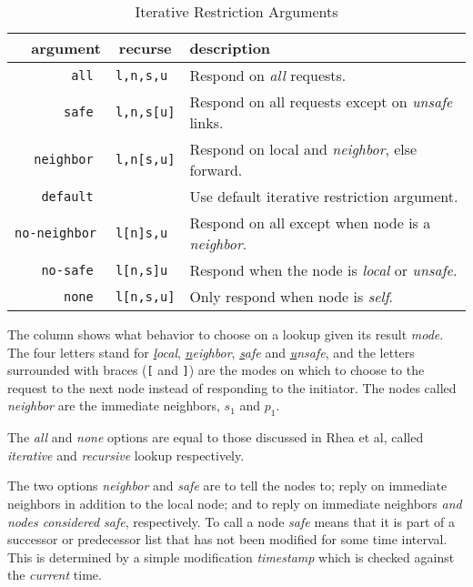 \begin{table}[htp]
\begin{center}
\begin{tabular}{|r|c|l|}                                                                       \hline
{\bf argument    } & {\bf recurse } & {\bf description}                                     \\ \hline
{\tt all         } & {\tt l,n,s,u } & Respond on \emph{all} requests.                       \\ \hline
{\tt safe        } & {\tt l,n,s[u]} & Respond on all requests except on \emph{unsafe} links.\\ \hline
{\tt neighbor    } & {\tt l,n[s,u]} & Respond on local and \emph{neighbor}, else forward.   \\ \hline
{\tt default     } & \              & Use default iterative restriction argument.           \\ \hline
{\tt no-neighbor } & {\tt l[n]s,u } & Respond on all except when node is a \emph{neighbor}. \\ \hline
{\tt no-safe     } & {\tt l[n,s]u } & Respond when the node is \emph{local} or \emph{unsafe}.\\ \hline
{\tt none        } & {\tt l[n,s,u]} & Only respond when node is \emph{self}.                \\ \hline
\end{tabular}
\parbox{.9\linewidth}{ \small
The  column shows what behavior to choose on a lookup given its result
 \emph{mode}. The four letters stand for \emph{\underline{l}ocal}, \emph{\underline{n}eighbor},
 \emph{\underline{s}afe} and \emph{\underline{u}nsafe}, and the letters surrounded with
 braces ({\tt[} and {\tt]}) are the modes on which to choose to  the request to
 the next node instead of responding to the initiator. The nodes called \emph{neighbor} are the
 immediate neighbors, $s_1$ and $p_1$.
}
\end{center}
\caption{Iterative Restriction Arguments}\label{tab:iter-args}
\end{table}

The \emph{all} and \emph{none} options are equal to those discussed in
 Rhea et al\cite{rhea-04-handling-churn}, called \emph{iterative} and
 \emph{recursive} lookup respectively.

The two options \emph{neighbor} and \emph{safe} are to tell the nodes to; reply on
 immediate neighbors in addition to the local node; and to reply on immediate neighbors
 \emph{and nodes considered safe}, respectively. To call a node \emph{safe} means that
 it is part of a successor or predecessor list that has not been modified for some
 time interval. This is determined by a simple modification \emph{timestamp} which
 is checked against the \emph{current} time.

